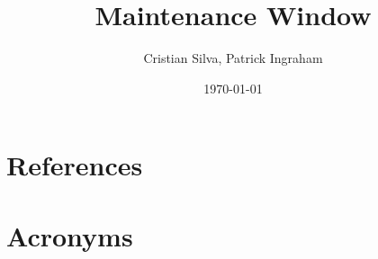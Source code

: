 \documentclass[PMO,authoryear,lsstdraft,toc]{lsstdoc}
\title{Maintenance Window}
\author{%
Cristian Silva, Patrick Ingraham
}
\date {\today}
\begin{document}
\maketitle




\appendix
\section{References} \label{sec:bib}
\renewcommand{\refname}{} %


\section{Acronyms} \label{sec:acronyms}

\end{document}
